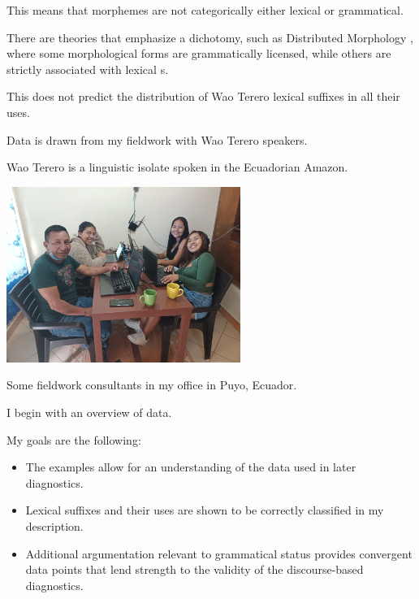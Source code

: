 \documentclass{beamer}
\begin{document}
\begin{frame}{This means that morphemes are not categorically either lexical or grammatical.}

  There are theories that emphasize a dichotomy, such as Distributed Morphology \citep{Bobaljik2017}, where some morphological forms are grammatically licensed, while others are strictly associated with lexical \dmroot{}s.

  \vfill
  
  This does not predict the distribution of Wao Terero lexical suffixes in all their uses.
  
\end{frame}

\begin{frame}{Data is drawn from my fieldwork with Wao Terero speakers.}

  Wao Terero is a linguistic isolate spoken in the Ecuadorian Amazon.

  \centering
  \includegraphics[width=3in]{consultants.jpg}

  \footnotesize Some fieldwork consultants in my office in Puyo, Ecuador.
\end{frame}

\begin{frame}{I begin with an overview of data.}

  My goals are the following:
  
  \begin{itemize}
  \item The examples allow for an understanding of the data used in later diagnostics.
  \item Lexical suffixes and their uses are shown to be correctly classified in my description.
  \item Additional argumentation relevant to grammatical status provides convergent data points that lend strength to the validity of the discourse-based diagnostics.
  \end{itemize}

\end{frame}
\end{document}
